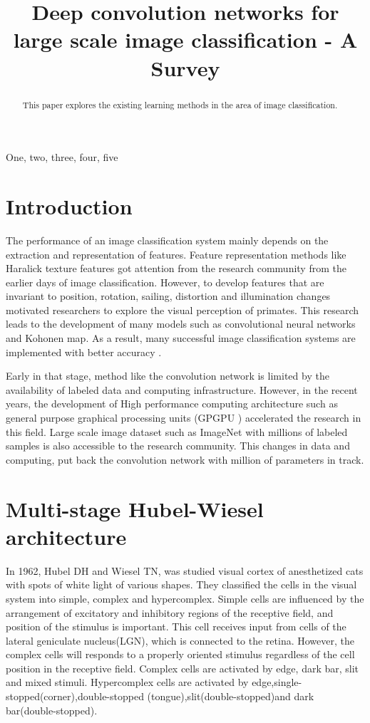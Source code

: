\documentclass{article}
\title { Deep convolution networks for large scale image classification - A Survey  }
\begin{document}
%
\maketitle
%
\begin{abstract}
This paper explores the existing learning methods  in the area of image classification.
\end{abstract}
%
\begin{keywords}
One, two, three, four, five
\end{keywords}
%
\section{Introduction}
\label{sec:intro}
The performance of an  image  classification system mainly depends on the  extraction and  representation of features.  Feature representation methods like Haralick texture features \cite{Haralick1973} got attention from the research community from the earlier days of  image classification. However, to develop features that are invariant to position, rotation, sailing, distortion and  illumination changes motivated researchers to  explore the visual perception of primates. This research  leads to  the development of many models such as convolutional neural networks\cite{LeCun1998} and  Kohonen map\cite{kohonen1982self}. 
As a result, many successful image classification systems are  implemented with better accuracy \cite{lecun-89e}.

Early in that stage, method like the convolution network is limited by the  availability of labeled  data and computing infrastructure.  However, in the recent years, the development of  High performance computing architecture such as general purpose graphical processing units (GPGPU )  accelerated the research in this field. Large scale image  dataset such as ImageNet\cite{imagenet}  with  millions of labeled samples is also accessible to the research community. This changes in data and computing, put back the convolution network with million of parameters in track. 


\section{Multi-stage Hubel-Wiesel architecture}
In 1962, Hubel DH and Wiesel TN\cite{Hubel1962},\cite{Hubel1965a} was studied visual cortex of anesthetized cats  with   spots of white light of various shapes. They classified the  cells in the visual system into  simple, complex and hypercomplex. Simple cells are influenced  by the arrangement of  excitatory and inhibitory regions of the receptive field, and  position of the stimulus is important. This cell receives input from cells of the lateral geniculate nucleus(LGN), which is connected to the retina. However, the complex cells will responds to  a properly  oriented stimulus regardless of the cell position in the receptive field. Complex cells are activated by edge, dark bar, slit and mixed stimuli. Hypercomplex cells are activated by edge,single-stopped(corner),double-stopped (tongue),slit(double-stopped)and dark bar(double-stopped).
\end{document}
